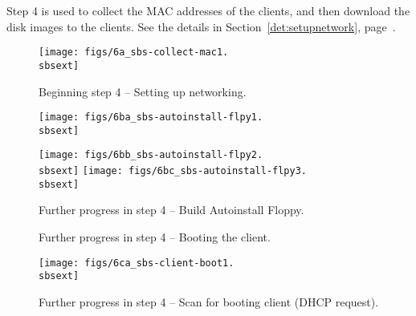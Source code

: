 Step 4 is used to collect the MAC addresses of the clients, and then
download the disk images to the clients.  See the details in
Section~\ref{det:setupnetwork}, page~\pageref{det:setupnetwork}.

\begin{figure}[h!]
  \begin{center}
    \centerline{\texttt{[image: figs/6a\_sbs-collect-mac1.\\sbsext]}}
    \caption{Beginning step 4 -- Setting up networking.}
    \label{fig:sbs-setup-network1}
  \end{center}
\end{figure}


\begin{figure}[h!]
  \begin{center}
    \centerline{\texttt{[image: figs/6ba\_sbs-autoinstall-flpy1.\\sbsext]}}
    \vspace{\imgvskip}
    \centerline{
      \texttt{[image: figs/6bb\_sbs-autoinstall-flpy2.\\sbsext]}
      \hspace{\imghskip}
      \texttt{[image: figs/6bc\_sbs-autoinstall-flpy3.\\sbsext]}
      }
    \caption{Further progress in step 4 -- Build Autoinstall Floppy.}
    \label{fig:sbs-autoinstall-flpy1}
  \end{center}
\end{figure}


\begin{figure}[h!]
  \begin{center}
    \centerline{
      }
    \caption{Further progress in step 4 -- Booting the client.}
    \label{fig:sbs-collect-boot1}
  \end{center}
\end{figure}

\begin{figure}[h!]
  \begin{center}
    \centerline{
      \texttt{[image: figs/6ca\_sbs-client-boot1.\\sbsext]}}
    \caption{Further progress in step 4 -- Scan for booting client (DHCP
      request).}
    \label{fig:sbs-client-boot2}
  \end{center}
\end{figure}

